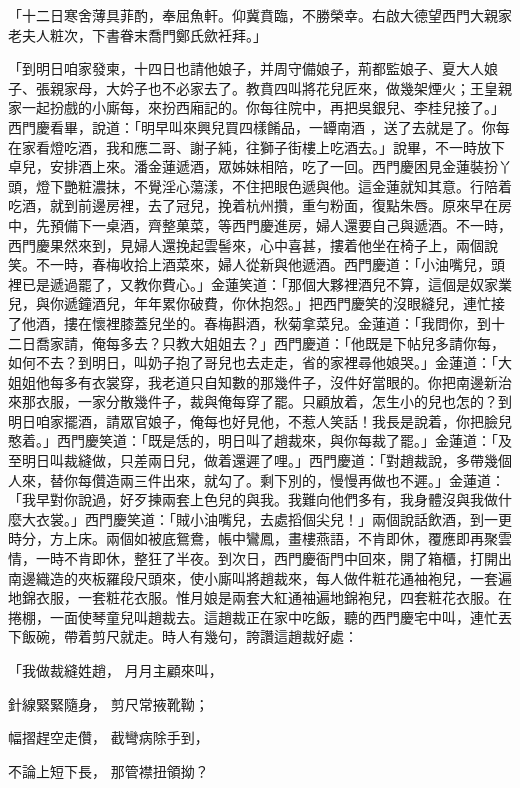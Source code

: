\begin{showcontents}{}
「十二日寒舍薄具菲酌，奉屈魚軒。仰冀賁臨，不勝榮幸。右啟大德望西門大親家老夫人粧次，下書眷末喬門鄭氏歛衽拜。」

「到明日咱家發柬，十四日也請他娘子，并周守備娘子，荊都監娘子、夏大人娘子、張親家母，大妗子也不必家去了。教賁四叫將花兒匠來，做幾架煙火；王皇親家一起扮戲的小廝每，來扮西廂記的。你每往院中，再把吳銀兒、李桂兒接了。」西門慶看畢，說道：「明早叫來興兒買四樣餚品，一罈南酒 ，送了去就是了。你每在家看燈吃酒，我和應二哥、謝子純，往獅子街樓上吃酒去。」說畢，不一時放下卓兒，安排酒上來。潘金蓮遞酒，眾姊妹相陪，吃了一回。西門慶困見金蓮裝扮丫頭，燈下艷粧濃抹，不覺淫心蕩漾，不住把眼色遞與他。這金蓮就知其意。行陪着吃酒，就到前邊房裡，去了冠兒，挽着杭州攢，重勻粉面，復點朱唇。原來早在房中，先預備下一桌酒，齊整菓菜，等西門慶進房，婦人還要自己與遞酒。不一時，西門慶果然來到，見婦人還挽起雲髻來，心中喜甚，摟着他坐在椅子上，兩個說笑。不一時，春梅收拾上酒菜來，婦人從新與他遞酒。西門慶道：「小油嘴兒，頭裡已是遞過罷了，又教你費心。」金蓮笑道：「那個大夥裡酒兒不算，這個是奴家業兒，與你遞鐘酒兒，年年累你破費，你休抱怨。」把西門慶笑的沒眼縫兒，連忙接了他酒，摟在懷裡膝蓋兒坐的。春梅斟酒，秋菊拿菜兒。金蓮道：「我問你，到十二日喬家請，俺每多去？只教大姐姐去？」西門慶道：「他既是下帖兒多請你每，如何不去？到明日，叫奶子抱了哥兒也去走走，省的家裡尋他娘哭。」金蓮道：「大姐姐他每多有衣裳穿，我老道只自知數的那幾件子，沒件好當眼的。你把南邊新治來那衣服，一家分散幾件子，裁與俺每穿了罷。只顧放着，怎生小的兒也怎的？到明日咱家擺酒，請眾官娘子，俺每也好見他，不惹人笑話！我長是說着，你把臉兒憨着。」西門慶笑道：「既是恁的，明日叫了趙裁來，與你每裁了罷。」金蓮道：「及至明日叫裁縫做，只差兩日兒，做着還遲了哩。」西門慶道：「對趙裁說，多帶幾個人來，替你每儹造兩三件出來，就勾了。剩下別的，慢慢再做也不遲。」金蓮道：「我早對你說過，好歹揀兩套上色兒的與我。我難向他們多有，我身體沒與我做什麼大衣裳。」西門慶笑道：「賊小油嘴兒，去處搯個尖兒！」兩個說話飲酒，到一更時分，方上床。兩個如被底鴛鴦，帳中鸞鳳，畫樓燕語，不肯即休，覆應即再聚雲情，一時不肯即休，整狂了半夜。到次日，西門慶衙門中回來，開了箱櫃，打開出南邊織造的夾板羅段尺頭來，使小廝叫將趙裁來，每人做件粧花通袖袍兒，一套遍地錦衣服，一套粧花衣服。惟月娘是兩套大紅通袖遍地錦袍兒，四套粧花衣服。在捲棚，一面使琴童兒叫趙裁去。這趙裁正在家中吃飯，聽的西門慶宅中叫，連忙丟下飯碗，帶着剪尺就走。時人有幾句，誇讚這趙裁好處：

「我做裁縫姓趙，  月月主顧來叫，

針線緊緊隨身，  剪尺常掖靴靿；

幅摺趕空走儹，  截彎病除手到，

不論上短下長，  那管襟扭領拗？


\end{showcontents}
